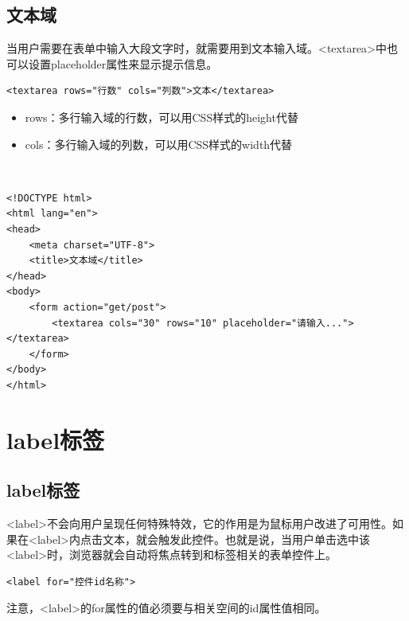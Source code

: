 \subsection{文本域}

当用户需要在表单中输入大段文字时，就需要用到文本输入域。<textarea>中也可以设置placeholder属性来显示提示信息。\\

\begin{lstlisting}[style=htmlcssjs]
<textarea rows="行数" cols="列数">文本</textarea>
\end{lstlisting}

\begin{itemize}
	\item rows：多行输入域的行数，可以用CSS样式的height代替
	\item cols：多行输入域的列数，可以用CSS样式的width代替
\end{itemize}

\vspace{0.5cm}

\\

\begin{lstlisting}[style=htmlcssjs]
<!DOCTYPE html>
<html lang="en">
<head>
    <meta charset="UTF-8">
    <title>文本域</title>
</head>
<body>
    <form action="get/post">
        <textarea cols="30" rows="10" placeholder="请输入..."></textarea>
    </form>
</body>
</html>
\end{lstlisting}

\newpage

\section{label标签}

\subsection{label标签}

<label>不会向用户呈现任何特殊特效，它的作用是为鼠标用户改进了可用性。如果在<label>内点击文本，就会触发此控件。也就是说，当用户单击选中该<label>时，浏览器就会自动将焦点转到和标签相关的表单控件上。

\begin{lstlisting}[style=htmlcssjs]
<label for="控件id名称">
\end{lstlisting}

注意，<label>的for属性的值必须要与相关空间的id属性值相同。\\

